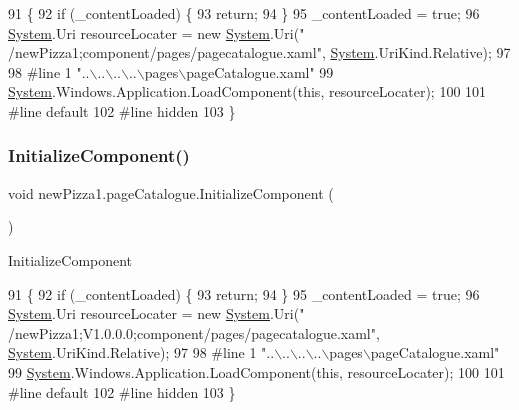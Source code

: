 \begin{DoxyCode}
91                                           \{
92             \textcolor{keywordflow}{if} (\_contentLoaded) \{
93                 \textcolor{keywordflow}{return};
94             \}
95             \_contentLoaded = \textcolor{keyword}{true};
96             \hyperlink{namespaceSystem}{System}.Uri resourceLocater = \textcolor{keyword}{new} \hyperlink{namespaceSystem}{System}.Uri(\textcolor{stringliteral}{"
      /newPizza1;component/pages/pagecatalogue.xaml"}, \hyperlink{namespaceSystem}{System}.UriKind.Relative);
97             
98 \textcolor{preprocessor}{            #line 1 "..\(\backslash\)..\(\backslash\)..\(\backslash\)..\(\backslash\)pages\(\backslash\)pageCatalogue.xaml"
}
99             \hyperlink{namespaceSystem}{System}.Windows.Application.LoadComponent(\textcolor{keyword}{this}, resourceLocater);
100             
101 \textcolor{preprocessor}{            #line default
}
102 \textcolor{preprocessor}{            #line hidden
}
103         \}
\end{DoxyCode}
\mbox{\label{classnewPizza1_1_1pageCatalogue_a43a8ad0ab6df5f89084c072525b49383}} 
\subsubsection{\texorpdfstring{Initialize\+Component()}{InitializeComponent()}\hspace{0.1cm}{\footnotesize\ttfamily [3/3]}}
{\footnotesize\ttfamily void new\+Pizza1.\+page\+Catalogue.\+Initialize\+Component (\begin{DoxyParamCaption}{ }\end{DoxyParamCaption})\hspace{0.3cm}{\ttfamily [inline]}}



Initialize\+Component 


\begin{DoxyCode}
91                                           \{
92             \textcolor{keywordflow}{if} (\_contentLoaded) \{
93                 \textcolor{keywordflow}{return};
94             \}
95             \_contentLoaded = \textcolor{keyword}{true};
96             \hyperlink{namespaceSystem}{System}.Uri resourceLocater = \textcolor{keyword}{new} \hyperlink{namespaceSystem}{System}.Uri(\textcolor{stringliteral}{"
      /newPizza1;V1.0.0.0;component/pages/pagecatalogue.xaml"}, \hyperlink{namespaceSystem}{System}.UriKind.Relative);
97             
98 \textcolor{preprocessor}{            #line 1 "..\(\backslash\)..\(\backslash\)..\(\backslash\)..\(\backslash\)pages\(\backslash\)pageCatalogue.xaml"}
99             \hyperlink{namespaceSystem}{System}.Windows.Application.LoadComponent(\textcolor{keyword}{this}, resourceLocater);
100             
101 \textcolor{preprocessor}{            #line default}
102 \textcolor{preprocessor}{            #line hidden}
103         \}
\end{DoxyCode}


